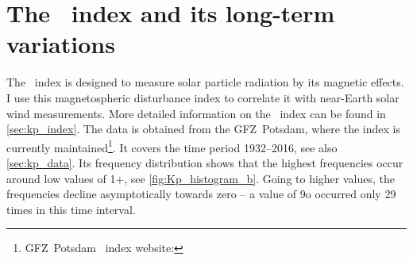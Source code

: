 \section{The \Kp{}~index and its long-term variations}
\label{sec:kp_long_term_variations}
The \Kp~index is designed to measure solar particle radiation by its magnetic effects. I use this magnetospheric disturbance index to correlate it with near-Earth solar wind measurements. More detailed information on the \Kp{}~index can be found in \autoref{sec:kp_index}.
The \Kp{} data is obtained from the GFZ~Potsdam, where the index is currently maintained\footnote{GFZ~Potsdam \Kp~index website: }. It covers the time period 1932--2016, see also \autoref{sec:kp_data}. Its frequency distribution shows that the highest frequencies occur around low \Kp{} values of 1+, see \autoref{fig:Kp_histogram_b}. Going to higher \Kp{} values, the frequencies decline asymptotically towards zero -- a \Kp{} value of 9o occurred only 29 times in this time interval.
